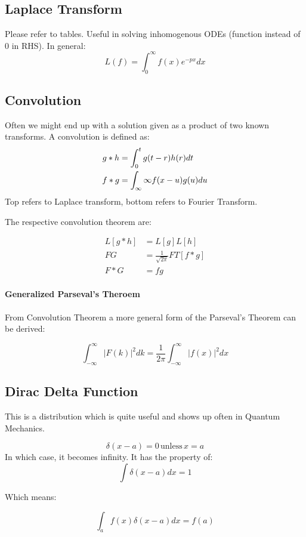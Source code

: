 \documentclass[12pt]{article}
\begin{document}
\subsection{Laplace Transform}

Please refer to tables. Useful in solving inhomogenous ODEs (function instead of 0 in RHS). In general:
\[ L(f) = \int_0^\infty f(x) e^{-px} dx \]

\subsection{Convolution}

Often we might end up with a solution given as a product of two known transforms. A convolution is defined as:
\begin{align*}
g*h &= \int_0^t g(t-r)h(r)dt \\
f*g &= \int_{\-\infty}{\infty}f(x-u)g(u)du
\end{align*}
Top refers to Laplace transform, bottom refers to Fourier Transform.

The respective convolution theorem are:

\begin{align*}
    L[g*h] &= L[g]L[h]\\
    FG &= \frac{1}{\sqrt{2\pi}}FT[f*g]\\
    F*G &= fg
\end{align*}

\paragraph{Generalized Parseval's Theroem}
From Convolution Theorem a more general form of the Parseval's Theorem can be derived:

\[\int^\infty_{-\infty} |F(k)|^2 dk =\frac{1}{2\pi} \int^\infty_{-\infty}|f(x)|^2dx\]

\subsection{Dirac Delta Function}

This is a distribution which is quite useful and shows up often in Quantum Mechanics.

\[ \delta(x - a) = 0 \, \text{unless} \, x=a\]
In which case, it becomes infinity. It has the property of:
\[\int \delta(x-a) dx = 1\]

Which means:

\[ \int_a f(x)\delta(x-a)dx = f(a)\]
\end{document}
